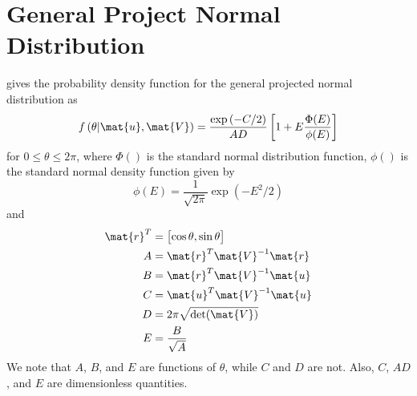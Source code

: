 \documentclass[12pt]{article}
\begin{document}
\section{General Project Normal Distribution}\label{8.1}
\citet[(1)]{Hernandez2017} gives the probability density function for the general projected normal distribution as
%
\begin{equation}\label{8.1}
    f\left( \theta | \mat{u}, \mat{V} \right)
    = \frac{\exp{(-C/2)}}{AD} \left[ 1 + E \frac{\Phi(E)}{\phi(E)} \right]
\end{equation}
%
for $0 \le \theta \le 2\pi$, where $\Phi()$ is the standard normal distribution function, $\phi()$ is the standard normal density function given by
%
\begin{equation}\label{8.2}
    \phi(E) = \frac{1}{\sqrt{2 \pi}} \exp{\left(-E^2/2\right)}
\end{equation}
%
and
%
\begin{align}
    \mat{r}^T &= \begin{bmatrix}\cos{\theta}, \sin{\theta} \end{bmatrix} \\
    A &= \mat{r}^T \mat{V}^{-1} \mat{r} \\
    B &= \mat{r}^T \mat{V}^{-1} \mat{u} \\
    C &= \mat{u}^T \mat{V}^{-1} \mat{u} \\
    D &= 2 \pi \sqrt{\text{det}(\mat{V})} \\
    E &= \frac{B}{\sqrt{A}}
\end{align}
%
We note that $A$, $B$, and $E$ are functions of $\theta$, while $C$ and $D$ are not. Also, $C$, $AD$, and $E$ are dimensionless quantities.
\end{document}
